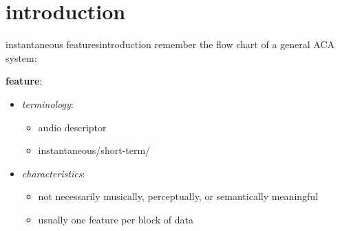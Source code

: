     \section[intro]{introduction}
        \begin{frame}{instantaneous features}{introduction}
            remember the flow chart of a general ACA system:
            \vspace{-2mm}
            \begin{figure}
                
            \end{figure}
            
            \vspace{-2mm}
            \pause
            \textbf{feature}:
            \begin{itemize}
                \item<2->   \textit{terminology}: 
                    \begin{itemize}
                        \item   audio descriptor
                        \item   instantaneous/short-term/
                    \end{itemize}
                \item<3->   \textit{characteristics}:
                    \begin{itemize}
                        \item	not necessarily musically, perceptually, or semantically meaningful
                        \item	usually one feature per block of data
                    \end{itemize}
            \end{itemize}
        \end{frame}
